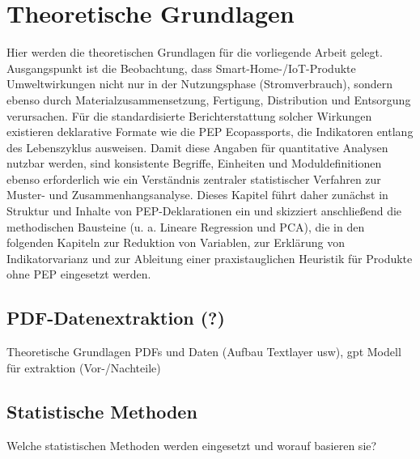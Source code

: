 \chapter{Theoretische Grundlagen}

Hier werden die theoretischen Grundlagen für die vorliegende Arbeit gelegt. 
Ausgangspunkt ist die Beobachtung, dass Smart-Home-/IoT-Produkte Umweltwirkungen nicht nur in der Nutzungsphase (Stromverbrauch), 
sondern ebenso durch Materialzusammensetzung, Fertigung, Distribution und Entsorgung verursachen. 
Für die standardisierte Berichterstattung solcher Wirkungen existieren deklarative Formate wie die PEP Ecopassports, 
die Indikatoren entlang des Lebenszyklus ausweisen. Damit diese Angaben für quantitative Analysen nutzbar werden, 
sind konsistente Begriffe, Einheiten und Moduldefinitionen ebenso erforderlich wie ein Verständnis zentraler 
statistischer Verfahren zur Muster- und Zusammenhangsanalyse. Dieses Kapitel führt daher zunächst in Struktur 
und Inhalte von PEP-Deklarationen ein und skizziert anschließend die methodischen Bausteine 
(u. a. Lineare Regression und PCA), die in den folgenden Kapiteln zur Reduktion von Variablen, 
zur Erklärung von Indikatorvarianz und zur Ableitung einer praxistauglichen Heuristik für Produkte ohne PEP eingesetzt werden.




\section{PDF-Datenextraktion (?)}
Theoretische Grundlagen PDFs und Daten (Aufbau Textlayer usw), gpt Modell für extraktion (Vor-/Nachteile)

\section{Statistische Methoden}
Welche statistischen Methoden werden eingesetzt und worauf basieren sie?

